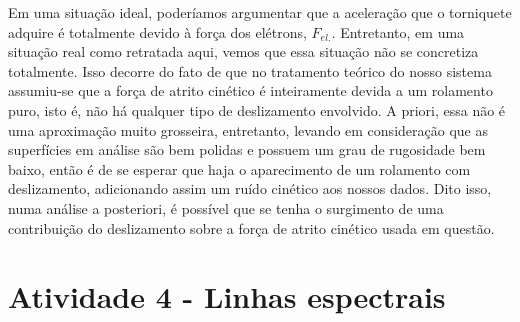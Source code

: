 \documentclass[12pt,a4paper]{article}
\begin{document}
\begin{enumerate}
    Em uma situação ideal, poderíamos argumentar que a aceleração que o torniquete adquire é totalmente devido à força dos elétrons, $F_{el.}$. Entretanto, em uma situação real como retratada aqui, vemos que essa situação não se concretiza totalmente. Isso decorre do fato de que no tratamento teórico do nosso sistema assumiu-se que a força de atrito cinético é inteiramente devida a um rolamento puro, isto é, não há qualquer tipo de deslizamento envolvido. A priori, essa não é uma aproximação muito grosseira, entretanto, levando em consideração que as superfícies em análise são bem polidas e possuem um grau de rugosidade bem baixo, então é de se esperar que haja o aparecimento de um rolamento com deslizamento, adicionando assim um ruído cinético aos nossos dados. Dito isso, numa análise a posteriori, é possível que se tenha o surgimento de uma contribuição do deslizamento sobre a força de atrito cinético usada em questão.
    
    
\end{enumerate}

\noindent\makebox[\linewidth]{\rule{\paperwidth}{0.4pt}}

\newpage

\section*{Atividade 4 - Linhas espectrais}
\end{document}
